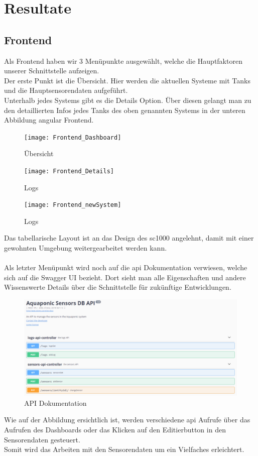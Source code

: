 \documentclass[../main.tex]{subfiles}
\begin{document}
	\section{Resultate}
	
	\subsection{Frontend}
	
	Als Frontend haben wir 3 Menüpunkte ausgewählt, welche die Hauptfaktoren unserer Schnittstelle aufzeigen. \\
	Der erste Punkt ist die Übersicht. Hier werden die aktuellen Systeme mit Tanks und die Hauptsensorendaten aufgeführt. \\
	Unterhalb jedes Systems gibt es die Details Option. Über diesen gelangt man zu den detaillierten Infos jedes Tanks des oben genannten Systems in der unteren Abbildung \gls{angular} Frontend. 
	\begin{figure}[H]
		\centering
		\texttt{[image: Frontend\_Dashboard]}
		\caption{Übersicht}
		\label{fig:Frontend_Dashboard}
	\end{figure}
	\begin{figure}[H]
		\centering
		\texttt{[image: Frontend\_Details]}
		\caption{Logs}
		\label{fig:Frontend_Details}
	\end{figure}	
	\begin{figure}[H]
		\centering
		\texttt{[image: Frontend\_newSystem]}
		\caption{Logs}
		\label{fig:Frontend_newSystem}
	\end{figure}
	\par
	\noindent	
	Das tabellarische Layout ist an das Design des \gls{sc1000} angelehnt, damit mit einer gewohnten Umgebung weitergearbeitet werden kann. 
	\\ \\
	Als letzter Menüpunkt wird noch auf die \gls{api} Dokumentation verwiesen, welche sich auf die Swagger UI bezieht. Dort sieht man alle Eigenschaften und andere Wissenswerte Details über die Schnittstelle für zukünftige Entwicklungen.\par 
	\begin{figure}[H]
		\centering
		\includegraphics[scale=0.4]{../images/API_Documentation}
		\caption{API Dokumentation}
		\label{fig:API_Documentation}
	\end{figure}
	\noindent
	Wie auf der Abbildung ersichtlich ist, werden verschiedene \gls{api} Aufrufe über das Aufrufen des Dashboards oder das Klicken auf den Editierbutton in den Sensorendaten gesteuert. 
	\\
	Somit wird das Arbeiten mit den Sensorendaten um ein Vielfaches erleichtert.
	
\end{document}
